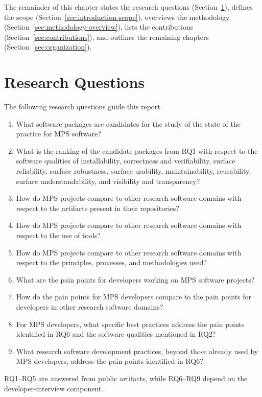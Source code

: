 The remainder of this chapter states the research questions (Section~\ref{sec:research-questions}), defines the scope (Section~\ref{sec:introduction-scope}), overviews the methodology (Section~\ref{sec:methodology-overview}), lists the contributions (Section~\ref{sec:contributions}), and outlines the remaining chapters (Section~\ref{sec:organization}).

\section{Research Questions}
\label{sec:research-questions}

The following research questions guide this report.

\begin{enumerate}[RQ1.]
    \item What software packages are candidates for the study of the state of the practice for MPS software?
    \item What is the ranking of the candidate packages from RQ1 with respect to the software qualities of installability, correctness and verifiability, surface reliability, surface robustness, surface usability, maintainability, reusability, surface understandability, and visibility and transparency?
    \item How do MPS projects compare to other research software domains with respect to the artifacts present in their repositories?
    \item How do MPS projects compare to other research software domains with respect to the use of tools?
    \item How do MPS projects compare to other research software domains with respect to the principles, processes, and methodologies used?
    \item What are the pain points for developers working on MPS software projects?
    \item How do the pain points for MPS developers compare to the pain points for developers in other research software domains?
    \item For MPS developers, what specific best practices address the pain points identified in RQ6 and the software qualities mentioned in RQ2?
    \item What research software development practices, beyond those already used by MPS developers, address the pain points identified in RQ6?
\end{enumerate}

RQ1--RQ5 are answered from public artifacts, while RQ6--RQ9 depend on the developer-interview component.

